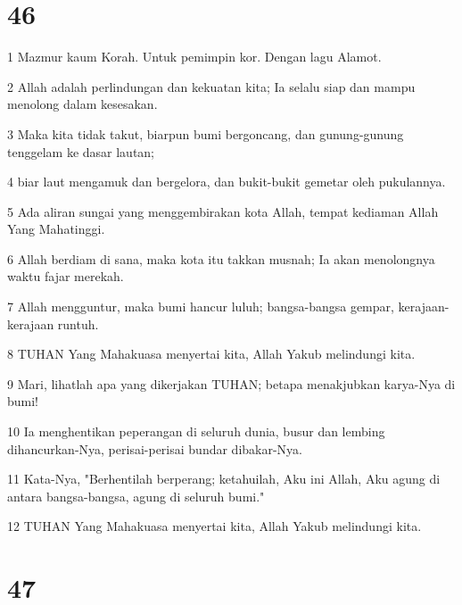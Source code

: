 \chapter{46}

\par 1 Mazmur kaum Korah. Untuk pemimpin kor. Dengan lagu Alamot.
\par 2 Allah adalah perlindungan dan kekuatan kita; Ia selalu siap dan mampu menolong dalam kesesakan.
\par 3 Maka kita tidak takut, biarpun bumi bergoncang, dan gunung-gunung tenggelam ke dasar lautan;
\par 4 biar laut mengamuk dan bergelora, dan bukit-bukit gemetar oleh pukulannya.
\par 5 Ada aliran sungai yang menggembirakan kota Allah, tempat kediaman Allah Yang Mahatinggi.
\par 6 Allah berdiam di sana, maka kota itu takkan musnah; Ia akan menolongnya waktu fajar merekah.
\par 7 Allah mengguntur, maka bumi hancur luluh; bangsa-bangsa gempar, kerajaan-kerajaan runtuh.
\par 8 TUHAN Yang Mahakuasa menyertai kita, Allah Yakub melindungi kita.
\par 9 Mari, lihatlah apa yang dikerjakan TUHAN; betapa menakjubkan karya-Nya di bumi!
\par 10 Ia menghentikan peperangan di seluruh dunia, busur dan lembing dihancurkan-Nya, perisai-perisai bundar dibakar-Nya.
\par 11 Kata-Nya, "Berhentilah berperang; ketahuilah, Aku ini Allah, Aku agung di antara bangsa-bangsa, agung di seluruh bumi."
\par 12 TUHAN Yang Mahakuasa menyertai kita, Allah Yakub melindungi kita.

\chapter{47}

